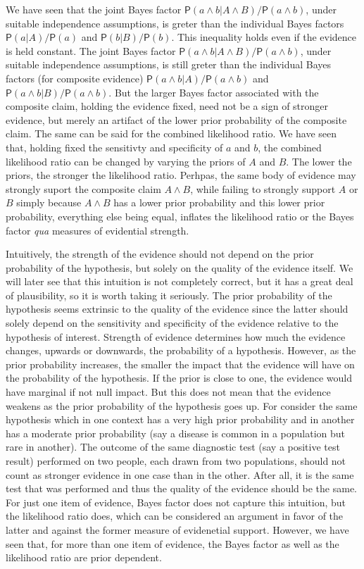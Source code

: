 \documentclass[10pt,dvipsnames,enabledeprecatedfontcommands]{scrartcl}
\newcommand{\pr}[1]{\mathsf{P}(#1)}
\begin{document}
We have seen that the joint Bayes factor
\(\pr{a \wedge b| A\wedge B}/\pr{a \wedge b}\), under suitable
independence assumptions, is greter than the individual Bayes factors
\(\pr{a | A}/\pr{a}\) and \(\pr{b|B}/\pr{b}\). This inequality holds
even if the evidence is held constant. The joint Bayes factor
\(\pr{a \wedge b| A\wedge B}/\pr{a \wedge b}\), under suitable
independence assumptions, is still greter than the individual Bayes
factors (for composite evidence) \(\pr{a \wedge b | A}/\pr{a\wedge b}\)
and \(\pr{a\wedge b|B}/\pr{a\wedge b}\). But the larger Bayes factor
associated with the composite claim, holding the evidence fixed, need
not be a sign of stronger evidence, but merely an artifact of the lower
prior probability of the composite claim. The same can be said for the
combined likelihood ratio. We have seen that, holding fixed the
sensitivty and specificity of \(a\) and \(b\), the combined likelihood
ratio can be changed by varying the priors of \(A\) and \(B\). The lower
the priors, the stronger the likelihood ratio. Perhpas, the same body of
evidence may strongly suport the composite claim \(A\wedge B\), while
failing to strongly support \(A\) or \(B\) simply because \(A\wedge B\)
has a lower prior probability and this lower prior probability,
everything else being equal, inflates the likelihood ratio or the Bayes
factor \textit{qua} measures of evidential strength.

Intuitively, the strength of the evidence should not depend on the prior
probability of the hypothesis, but solely on the quality of the evidence
itself. We will later see that this intuition is not completely correct,
but it has a great deal of plausibility, so it is worth taking it
seriously. The prior probability of the hypothesis seems extrinsic to
the quality of the evidence since the latter should solely depend on the
sensitivity and specificity of the evidence relative to the hypothesis
of interest. Strength of evidence determines how much the evidence
changes, upwards or downwards, the probability of a hypothesis. However,
as the prior probability increases, the smaller the impact that the
evidence will have on the probability of the hypothesis. If the prior is
close to one, the evidence would have marginal if not null impact. But
this does not mean that the evidence weakens as the prior probability of
the hypothesis goes up. For consider the same hypothesis which in one
context has a very high prior probability and in another has a moderate
prior probability (say a disease is common in a population but rare in
another). The outcome of the same diagnostic test (say a positive test
result) performed on two people, each drawn from two populations, should
not count as stronger evidence in one case than in the other. After all,
it is the same test that was performed and thus the quality of the
evidence should be the same. For just one item of evidence, Bayes factor
does not capture this intuition, but the likelihood ratio does, which
can be considered an argument in favor of the latter and against the
former measure of evidenetial support. However, we have seen that, for
more than one item of evidence, the Bayes factor as well as the
likelihood ratio are prior dependent.
\end{document}
